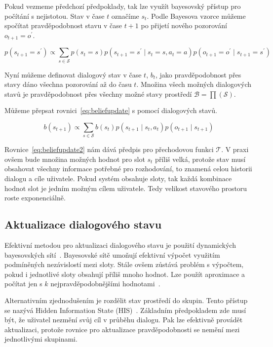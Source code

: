 Pokud vezmeme předchozí předpoklady, tak lze využít bayesovský přístup pro počítání s nejistotou.
Stav v čase $t$ označíme $s_t$.
Podle Bayesova vzorce můžeme spočítat pravděpodobnost stavu v čase $t+1$ po přijetí nového pozorování $o_{t+1} = o^\prime$.

\begin{equation}
p(s_{t+1} = s^\prime) \propto
    \sum_{s \in \mathcal{S}}
        p(s_t = s)
        p(s_{t+1} = s^\prime \mid s_t = s, a_t = a) p(o_{t+1} = o^\prime \mid s_{t+1} = s^\prime)
\label{eq:beliefupdate}
\end{equation}

Nyní můžeme definovat dialogový stav v čase $t$, $b_t$, jako pravděpodobnost přes stavy dáno všechna pozorování až do času $t$.
Množina všech možných dialogových stavů je pravděpodobnost přes všechny možné stavy prostředí $\mathcal{B} = \prod(\mathcal{S})$.

Můžeme přepsat rovnici~\eqref{eq:beliefupdate} s pomocí dialogových stavů.

\begin{equation}
b(s_{t+1}) \propto
    \sum_{s \in \mathcal{S}}
        b(s_t)
        p(s_{t+1} \mid s_t, a_t)
        p(o_{t+1} \mid s_{t+1})
\label{eq:beliefupdate2}
\end{equation}

Rovnice~\eqref{eq:beliefupdate2} nám dává předpis pro přechodovou funkci $\mathcal{T}$.
V praxi ovšem bude množina možných hodnot pro slot $s_t$ příliš velká, protože stav musí obsahovat všechny informace potřebné pro rozhodování, to znamená celou historii dialogu a cíle uživatele. 
Pokud systém obsahuje sloty, tak každá kombinace hodnot slot je jedním možným cílem uživatele. 
Tedy velikost stavového prostoru roste exponenciálně.

\subsection{Aktualizace dialogového stavu}

Efektivní metodou pro aktualizaci dialogového stavu je použití dynamických bayesovských sítí~\cite{thomson2008bayesian}.
Bayesovské sítě umoňují efektivní výpočet využitím podmíněných nezávislostí mezi sloty.
Stále ovšem zůstává problém s výpočtem, pokud i jednotlivé sloty obsahují příliš mnoho hodnot.
Lze použít aproximace a počítat jen s $k$ nejpravděpodobnějšími hodnotami~\cite{thomson2010bayesian}.

Alternativním zjednodušením je rozdělit stav prostředí do skupin. 
Tento přístup se nazývá Hidden Information State (HIS)~\cite{young2010hidden}.
Základním předpokladem zde musí být, že uživatel nezmění svůj cíl v průběhu dialogu.
Pak lze efektivně provádět aktualizaci, protože rovnice pro aktualizace pravděpodobnosti se nemění mezi jednotlivými skupinami.
